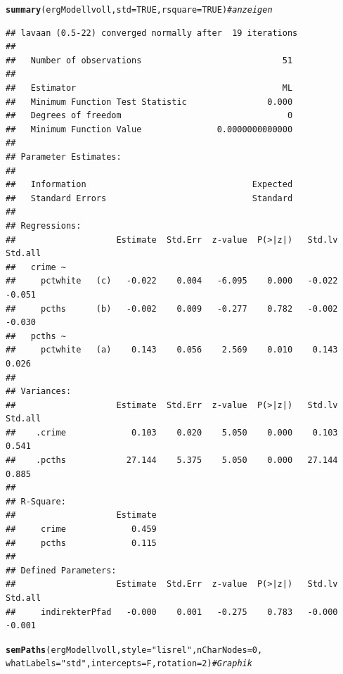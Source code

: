 \documentclass[a4paper]{article}\usepackage[]{graphicx}\usepackage[]{color}
\makeatletter
\newcommand{\hlnum}[1]{\textcolor[rgb]{0.686,0.059,0.569}{#1}}%
\newcommand{\hlstr}[1]{\textcolor[rgb]{0.192,0.494,0.8}{#1}}%
\newcommand{\hlcom}[1]{\textcolor[rgb]{0.678,0.584,0.686}{\textit{#1}}}%
\newcommand{\hlstd}[1]{\textcolor[rgb]{0.345,0.345,0.345}{#1}}%
\newcommand{\hlkwc}[1]{\textcolor[rgb]{0.333,0.667,0.333}{#1}}%
\newcommand{\hlkwd}[1]{\textcolor[rgb]{0.737,0.353,0.396}{\textbf{#1}}}%
\newenvironment{kframe}{%
 \def\at@end@of@kframe{}%
 \ifinner\ifhmode%
  \def\at@end@of@kframe{\end{minipage}}%
  \begin{minipage}{\columnwidth}%
 \fi\fi%
 \def\FrameCommand##1{\hskip\@totalleftmargin \hskip-\fboxsep
 \colorbox{shadecolor}{##1}\hskip-\fboxsep
     \hskip-\linewidth \hskip-\@totalleftmargin \hskip\columnwidth}%
 \MakeFramed {\advance\hsize-\width
   \@totalleftmargin\z@ \linewidth\hsize
   \@setminipage}}%
 {\par\unskip\endMakeFramed%
 \at@end@of@kframe}
\newenvironment{knitrout}{}{} %
\makeatother
\begin{document}
\begin{knitrout}
\begin{kframe}
\begin{alltt}
\hlkwd{summary}\hlstd{(ergModellvoll,} \hlkwc{std}\hlstd{=}\hlnum{TRUE}\hlstd{,} \hlkwc{rsquare}\hlstd{=}\hlnum{TRUE}\hlstd{)} \hlcom{# anzeigen}
\end{alltt}
\begin{verbatim}
## lavaan (0.5-22) converged normally after  19 iterations
## 
##   Number of observations                            51
## 
##   Estimator                                         ML
##   Minimum Function Test Statistic                0.000
##   Degrees of freedom                                 0
##   Minimum Function Value               0.0000000000000
## 
## Parameter Estimates:
## 
##   Information                                 Expected
##   Standard Errors                             Standard
## 
## Regressions:
##                    Estimate  Std.Err  z-value  P(>|z|)   Std.lv  Std.all
##   crime ~                                                               
##     pctwhite   (c)   -0.022    0.004   -6.095    0.000   -0.022   -0.051
##     pcths      (b)   -0.002    0.009   -0.277    0.782   -0.002   -0.030
##   pcths ~                                                               
##     pctwhite   (a)    0.143    0.056    2.569    0.010    0.143    0.026
## 
## Variances:
##                    Estimate  Std.Err  z-value  P(>|z|)   Std.lv  Std.all
##    .crime             0.103    0.020    5.050    0.000    0.103    0.541
##    .pcths            27.144    5.375    5.050    0.000   27.144    0.885
## 
## R-Square:
##                    Estimate
##     crime             0.459
##     pcths             0.115
## 
## Defined Parameters:
##                    Estimate  Std.Err  z-value  P(>|z|)   Std.lv  Std.all
##     indirekterPfad   -0.000    0.001   -0.275    0.783   -0.000   -0.001
\end{verbatim}
\begin{alltt}
\hlkwd{semPaths}\hlstd{(ergModellvoll,} \hlkwc{style}\hlstd{=}\hlstr{"lisrel"}\hlstd{,}\hlkwc{nCharNodes} \hlstd{=} \hlnum{0}\hlstd{,}
         \hlkwc{whatLabels}\hlstd{=}\hlstr{"std"}\hlstd{,}\hlkwc{intercepts} \hlstd{= F,}\hlkwc{rotation}\hlstd{=}\hlnum{2}\hlstd{)} \hlcom{# Graphik}
\end{alltt}
\end{kframe}

\end{knitrout}
\end{document}
